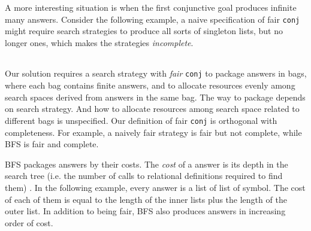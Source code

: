 \documentclass[format=acmlarge, review=true, authordraft=true]{acmart}
\newcommand{\conj}{\texttt{conj}}
\begin{document}
\begin{center}
	\begin{tabular}{c|c}
		
	\end{tabular}
\end{center}

A more interesting situation is when the first conjunctive goal produces 
infinite many answers. Consider the following example, a naive specification of 
fair \conj{} might require search strategies to produce all sorts of singleton 
lists, but no longer ones, which makes the strategies \emph{incomplete}. 

\begin{center}
	\begin{tabular}{c}
		
	\end{tabular}
\end{center}

Our solution requires a search strategy with \emph{fair} \conj{} to 
package answers in bags, where each bag contains finite answers, and to allocate 
resources evenly among search spaces derived from answers in the same bag. The 
way to package depends on search strategy. And how to allocate resources among 
search space related to different bags is unspecified. Our definition of fair 
\conj{} is orthogonal with completeness. For example, a naively fair strategy 
is fair but not complete, while BFS is fair and complete. 

BFS packages answers by their costs. The \emph{cost} of a answer is its 
depth in the search tree (i.e. the number of calls to relational definitions 
required to find them) \citet{seres1999algebra}. In the following example, 
every answer is a list of list of symbol. The cost of each of them is equal to 
the length of the inner lists plus the length of the outer list. In addition to 
being fair, BFS also produces answers in increasing order of cost.

\begin{center}
	\begin{tabular}{c}
		
	\end{tabular}
\end{center}
\end{document}
